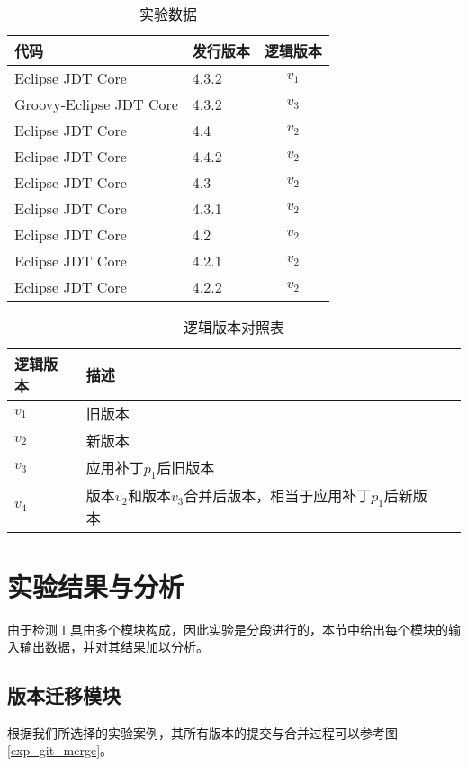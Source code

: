 \begin{table}
	\caption{实验数据}
	\label{exp_data}
	\centering
	\begin{tabular}{llc}
		\toprule[1.5pt]
		{\heiti 代码} & {\heiti 发行版本} & {\heiti 逻辑版本} \\\midrule[1pt]
		Eclipse JDT Core & 4.3.2 & $v_1$ \\
		Groovy-Eclipse JDT Core & 4.3.2 & $v_3$\\
		Eclipse JDT Core & 4.4 & $v_2$\\
		Eclipse JDT Core & 4.4.2 & $v_2$\\
		Eclipse JDT Core & 4.3 & $v_2$\\
		Eclipse JDT Core & 4.3.1 & $v_2$\\
		Eclipse JDT Core & 4.2 & $v_2$\\
		Eclipse JDT Core & 4.2.1 & $v_2$\\
		Eclipse JDT Core & 4.2.2 & $v_2$\\
		\bottomrule[1.5pt]
	\end{tabular}
\end{table}

\begin{table}
	\caption{逻辑版本对照表}
	\label{exp_version}
	\centering
	\begin{tabular}{llc}
		\toprule[1.5pt]
		{\heiti 逻辑版本} & {\heiti 描述} \\\midrule[1pt]
		$v_1$ & 旧版本 \\
		$v_2$ & 新版本\\
		$v_3$ & 应用补丁$p_1$后旧版本\\
		$v_4$ & 版本$v_2$和版本$v_3$合并后版本，相当于应用补丁$p_1$后新版本\\
		\bottomrule[1.5pt]
	\end{tabular}
\end{table}

\section{实验结果与分析}

由于检测工具由多个模块构成，因此实验是分段进行的，本节中给出每个模块的输入输出数据，并对其结果加以分析。
\subsection{版本迁移模块}

根据我们所选择的实验案例，其所有版本的提交与合并过程可以参考图\ref {exp_git_merge}。

